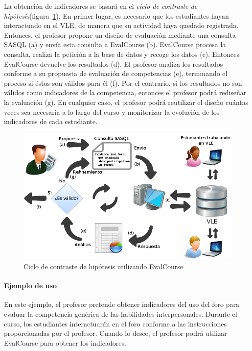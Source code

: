 La obtención de indicadores se basará en el \emph{ciclo de contraste de hipótesis}(figura~\ref{fig:EVCDiagram}). En primer lugar, es necesario que los estudiantes hayan interactuado en el VLE, de manera que su actividad haya quedado registrada. Entonces, el profesor propone un diseño de evaluación mediante una consulta SASQL (a) y envía esta consulta a EvalCourse (b). EvalCourse procesa la consulta, realiza la petición a la base de datos y recoge los datos (c). Entonces EvalCourse devuelve los resultados (d). El profesor analiza los resultados conforme a su propuesta de evaluación de competencias (e), terminando el proceso si éstos son válidos para él (f). Por el contrario, si los resultados no son válidos como indicadores de la competencia, entonces el profesor podrá rediseñar la evaluación (g). En cualquier caso, el profesor podrá reutilizar el diseño cuántas veces sea necesaria a lo largo del curso y monitorizar la evolución de los indicadores de cada estudiante.

\begin{figure}
  \begin{center}
    \includegraphics[scale=0.45]{EvcDiagram.png}
  \end{center}
  \caption{Ciclo de contraste de hipótesis utilizando EvalCourse}
  \label{fig:EVCDiagram}
\end{figure}

\paragraph*{Ejemplo de uso} %

En este ejemplo, el profesor pretende obtener indicadores del uso del foro para evaluar la competencia genérica de las habilidades interpersonales. Durante el curso, los estudiantes interactuarán en el foro conforme a las instrucciones proporcionadas por el profesor. Cuando lo desee, el profesor podrá utilizar EvalCourse para obtener los indicadores.


